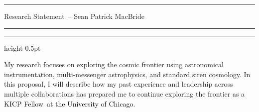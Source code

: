 \documentclass[11pt]{article}
\newcommand{\tcolor}{black}
\newcommand{\yourname}{Sean Patrick MacBride}
\newcommand{\soptitle}{Research Statement}
\newcommand{\Institute}{\textcolor{\tcolor}{the University of Chicago}}
\newcommand{\Position}{\textcolor{\tcolor}{KICP Fellow}}
\begin{document}
\hrule
\begin{center}
    \Large\soptitle\ -- \yourname
\end{center}
\vspace{0pt}
\hrule
\vspace{0.5pt}
\hrule height 0.5pt
\vspace{3pt}

\normalsize
\noindent My research focuses on exploring the cosmic frontier using astronomical instrumentation, multi-messenger astrophysics, and standard siren cosmology.
In this proposal, I will describe how my past experience and leadership across multiple collaborations has prepared me to continue exploring the frontier as a \Position\ at \Institute.

  
\end{document}

